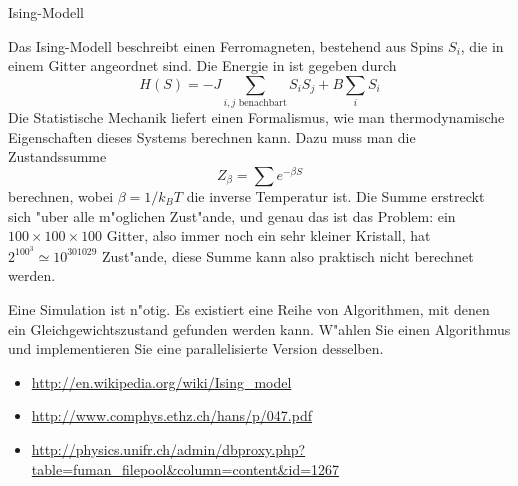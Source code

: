 \begin{aufgabe}
Ising-Modell
\end{aufgabe}

Das Ising-Modell beschreibt einen Ferromagneten, bestehend aus 
Spins $S_i$, die in einem Gitter angeordnet sind. Die Energie
in ist gegeben durch
\[
H(S)=-J\sum_{\text{$i,j$ benachbart}}S_iS_j + B\sum_i S_i
\]
Die Statistische Mechanik liefert einen Formalismus, wie man thermodynamische
Eigenschaften dieses Systems berechnen kann. Dazu muss man die Zustandssumme
\[
Z_\beta = \sum e^{-\beta S}
\]
berechnen, wobei $\beta=1/k_BT$ die inverse Temperatur ist.
Die Summe erstreckt sich "uber alle m"oglichen Zust"ande, und genau das
ist das Problem: ein $100\times 100 \times 100$ Gitter, also immer noch
ein sehr kleiner Kristall, hat $2^{100^3}\simeq 10^{301029}$ Zust"ande,
diese Summe kann also praktisch nicht berechnet werden.

Eine Simulation ist n"otig.
Es existiert eine Reihe von Algorithmen, mit denen ein Gleichgewichtszustand
gefunden werden kann.
W"ahlen Sie einen Algorithmus und implementieren Sie eine parallelisierte
Version desselben.

\begin{itemize}
\item
\url{http://en.wikipedia.org/wiki/Ising_model}
\item
\url{http://www.comphys.ethz.ch/hans/p/047.pdf}
\item
\url{http://physics.unifr.ch/admin/dbproxy.php?table=fuman_filepool&column=content&id=1267}
\end{itemize}

